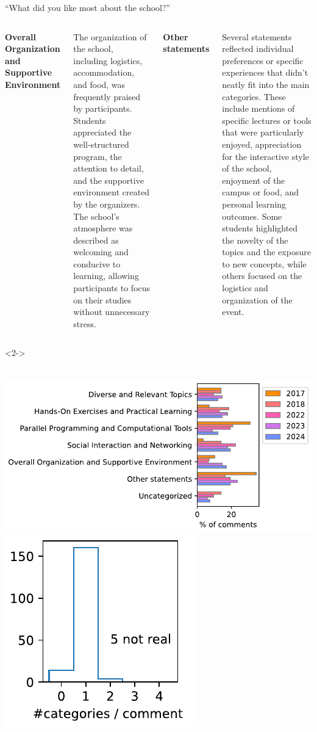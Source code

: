 \documentclass[aspectratio=169]{beamer}
\begin{document}
\begin{frame}{``What did you like most about the school?''}
\begin{columns}
\vspace{0.2 cm}
{\bf\small Overall Organization and Supportive Environment}

The organization of the school, including logistics, accommodation, and food, was frequently praised by participants. Students appreciated the well-structured program, the attention to detail, and the supportive environment created by the organizers. The school's atmosphere was described as welcoming and conducive to learning, allowing participants to focus on their studies without unnecessary stress.

\vspace{0.2 cm}
{\bf\small Other statements}

Several statements reflected individual preferences or specific experiences that didn't neatly fit into the main categories. These include mentions of specific lectures or tools that were particularly enjoyed, appreciation for the interactive style of the school, enjoyment of the campus or food, and personal learning outcomes. Some students highlighted the novelty of the topics and the exposure to new concepts, while others focused on the logistics and organization of the event.
\end{columns}

\begin{uncoverenv}<2->
\vspace{-5 cm}
\begin{tcolorbox}[colback=white, colframe=black]
\begin{minipage}{\linewidth}
\mbox{ } \hfill \includegraphics[height=4 cm]{PLOTS/like_most_categorization.pdf}\includegraphics[height=3 cm]{PLOTS/like_most_categorization_hist.pdf} \hfill \mbox{ }
\end{minipage}
\end{tcolorbox}
\end{uncoverenv}
\end{frame}
\end{document}
